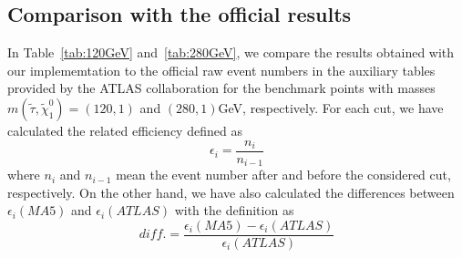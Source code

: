 \documentclass{ws-mpla}
\begin{document}
\subsection{Comparison with the official results}
In Table~\ref{tab:120GeV} and~\ref{tab:280GeV}, we compare the results obtained with our implememtation to the official raw event numbers in the auxiliary tables provided by the ATLAS collaboration for the benchmark points with masses $m(\tilde{\tau},\tilde{\chi}^0_1)=(120,1) $ and $(280,1)$GeV, respectively. 
For each cut, we have calculated the related efficiency defined as 
\begin{equation}
\epsilon_i =\frac{n_i}{n_{i-1}}
\end{equation}
where $ n_i $ and $ n_{i-1} $ mean the event number after and before the considered cut, respectively.
%
On the other hand, we have also calculated the differences between $ \epsilon_i (MA5)$ and $ \epsilon_i (ATLAS)$ with the definition as
\begin{equation}
diff. = \frac{\epsilon_i (MA5)-\epsilon_i (ATLAS)}{\epsilon_i (ATLAS)}
\end{equation}
\end{document}
